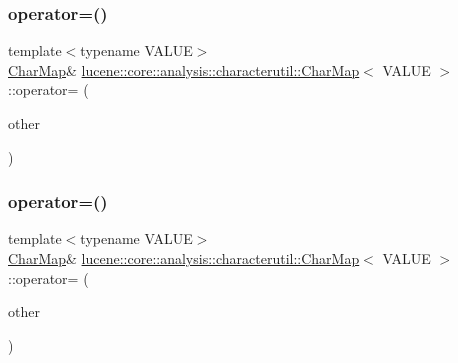 \mbox{\label{classlucene_1_1core_1_1analysis_1_1characterutil_1_1CharMap_aabcf4f0d534fb6050aeb140d418a0fba}} 
\subsubsection{\texorpdfstring{operator=()}{operator=()}\hspace{0.1cm}{\footnotesize\ttfamily [1/2]}}
{\footnotesize\ttfamily template$<$typename V\+A\+L\+UE$>$ \\
\mbox{\hyperlink{classlucene_1_1core_1_1analysis_1_1characterutil_1_1CharMap}{Char\+Map}}\& \mbox{\hyperlink{classlucene_1_1core_1_1analysis_1_1characterutil_1_1CharMap}{lucene\+::core\+::analysis\+::characterutil\+::\+Char\+Map}}$<$ V\+A\+L\+UE $>$\+::operator= (\begin{DoxyParamCaption}\item[{\mbox{\hyperlink{ZlibCrc32_8h_a2c212835823e3c54a8ab6d95c652660e}{const}} \mbox{\hyperlink{classlucene_1_1core_1_1analysis_1_1characterutil_1_1CharMap}{Char\+Map}}$<$ V\+A\+L\+UE $>$ \&}]{other }\end{DoxyParamCaption})\hspace{0.3cm}{\ttfamily [inline]}}

\mbox{\label{classlucene_1_1core_1_1analysis_1_1characterutil_1_1CharMap_adef93a87f617af2b3f949b40ffd82cca}} 
\subsubsection{\texorpdfstring{operator=()}{operator=()}\hspace{0.1cm}{\footnotesize\ttfamily [2/2]}}
{\footnotesize\ttfamily template$<$typename V\+A\+L\+UE$>$ \\
\mbox{\hyperlink{classlucene_1_1core_1_1analysis_1_1characterutil_1_1CharMap}{Char\+Map}}\& \mbox{\hyperlink{classlucene_1_1core_1_1analysis_1_1characterutil_1_1CharMap}{lucene\+::core\+::analysis\+::characterutil\+::\+Char\+Map}}$<$ V\+A\+L\+UE $>$\+::operator= (\begin{DoxyParamCaption}\item[{\mbox{\hyperlink{ZlibCrc32_8h_a2c212835823e3c54a8ab6d95c652660e}{const}} \mbox{\hyperlink{classlucene_1_1core_1_1analysis_1_1characterutil_1_1CharMap}{Char\+Map}}$<$ V\+A\+L\+UE $>$ \&\&}]{other }\end{DoxyParamCaption})\hspace{0.3cm}{\ttfamily [inline]}}

